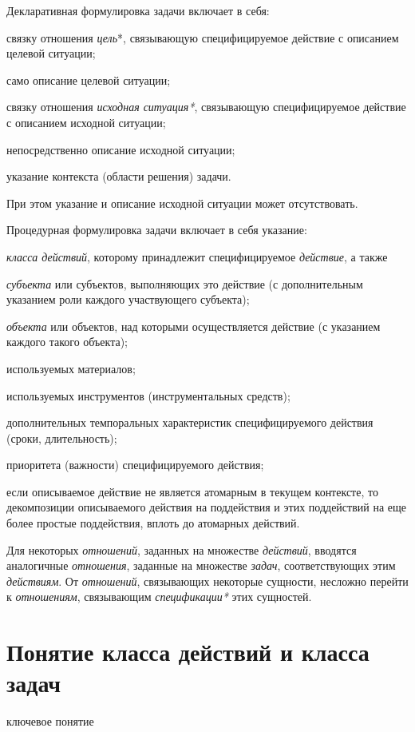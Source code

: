 Декларативная формулировка задачи включает в себя:
\begin{textitemize}
	\item связку отношения \textit{цель}*, связывающую специфицируемое действие с описанием целевой ситуации;
	\item само описание целевой ситуации;
	\item связку отношения \textit{исходная ситуация*}, связывающую специфицируемое действие с описанием исходной ситуации;
	\item непосредственно описание исходной ситуации;
	\item указание контекста (области решения) задачи.
\end{textitemize}
При этом указание и описание исходной ситуации может отсутствовать.

Процедурная формулировка задачи включает в себя указание:
\begin{textitemize}
	\item \textit{класса действий}, которому принадлежит специфицируемое \textit{действие}, а также
	\item \textit{субъекта} или субъектов, выполняющих это действие (с дополнительным указанием роли каждого участвующего субъекта);
	\item \textit{объекта} или объектов, над которыми осуществляется действие (с указанием  каждого такого объекта);
	\item используемых материалов;
	\item используемых инструментов (инструментальных средств);
	\item дополнительных темпоральных характеристик специфицируемого действия (сроки, длительность);
	\item приоритета (важности) специфицируемого действия;
	\item если описываемое действие не является атомарным в текущем контексте, то декомпозиции описываемого действия на поддействия и этих поддействий на еще более простые поддействия, вплоть до атомарных действий.
\end{textitemize}

Для некоторых \textit{отношений}, заданных на множестве \textit{действий}, вводятся аналогичные \textit{отношения}, заданные на множестве \textit{задач}, соответствующих этим \textit{действиям}. От \textit{отношений}, связывающих некоторые сущности, несложно перейти к \textit{отношениям}, связывающим \textit{спецификации*} этих сущностей.

\section{Понятие класса действий и класса задач}
\label{sec_action_and_problem_classes}
\begin{SCn}
	\begin{scnrelfromlist}{ключевое понятие}
	\end{scnrelfromlist}
\end{SCn}

